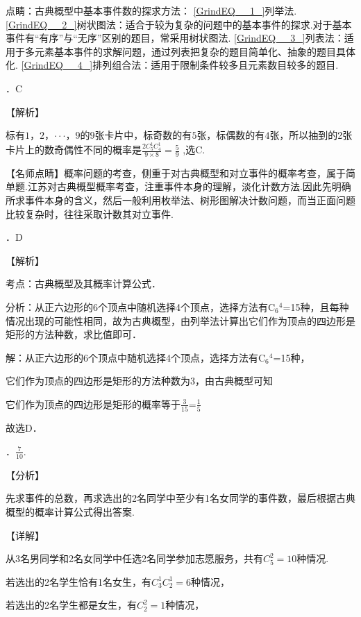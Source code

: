 \documentclass[a4paper,11pt,UTF8,twoside]{ctexart} %
\begin{document}
\noindent 点睛：古典概型中基本事件数的探求方法： \eqref{GrindEQ__1_}列举法. \eqref{GrindEQ__2_}树状图法：适合于较为复杂的问题中的基本事件的探求.对于基本事件有``有序''与``无序''区别的题目，常采用树状图法. \eqref{GrindEQ__3_}列表法：适用于多元素基本事件的求解问题，通过列表把复杂的题目简单化、抽象的题目具体化. \eqref{GrindEQ__4_}排列组合法：适用于限制条件较多且元素数目较多的题目.

．C

\noindent 【解析】

\noindent 标有$1$，$2$，$\cdot \cdot \cdot $，$9$的$9$张卡片中，标奇数的有$5$张，标偶数的有$4$张，所以抽到的2张卡片上的数奇偶性不同的概率是$\frac{2C_{5}^{1} C_{4}^{1} }{9\times 8} =\frac{5}{9} $ ,选C.

\noindent 【名师点睛】概率问题的考查，侧重于对古典概型和对立事件的概率考查，属于简单题.江苏对古典概型概率考查，注重事件本身的理解，淡化计数方法.因此先明确所求事件本身的含义，然后一般利用枚举法、树形图解决计数问题，而当正面问题比较复杂时，往往采取计数其对立事件.

．D

\noindent 【解析】

\noindent 考点：古典概型及其概率计算公式．

\noindent 分析：从正六边形的6个顶点中随机选择4个顶点，选择方法有C${}_{6}$${}^{4}$=15种，且每种情况出现的可能性相同，故为古典概型，由列举法计算出它们作为顶点的四边形是矩形的方法种数，求比值即可．

\noindent 解：从正六边形的6个顶点中随机选择4个顶点，选择方法有C${}_{6}$${}^{4}$=15种，

\noindent 它们作为顶点的四边形是矩形的方法种数为3，由古典概型可知

\noindent 它们作为顶点的四边形是矩形的概率等于$\frac{3}{15} $=$\frac{1}{5} $

\noindent 故选D．

\noindent 

．$\frac{7}{10} $.

\noindent 【分析】

\noindent 先求事件的总数，再求选出的2名同学中至少有1名女同学的事件数，最后根据古典概型的概率计算公式得出答案.

\noindent 【详解】

\noindent 从3名男同学和2名女同学中任选2名同学参加志愿服务，共有$C_{5}^{2} =10$种情况.

\noindent 若选出的2名学生恰有1名女生，有$C_{3}^{1} C_{2}^{1} =6$种情况，

\noindent 若选出的2名学生都是女生，有$C_{2}^{2} =1$种情况，
\end{document}
